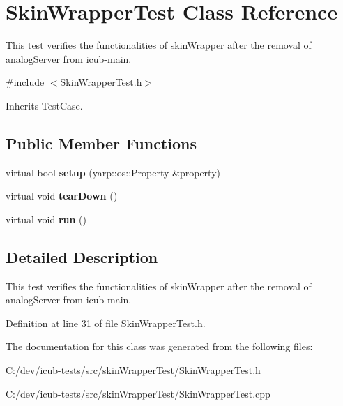 \section{Skin\+Wrapper\+Test Class Reference}
\label{classSkinWrapperTest}


This test verifies the functionalities of skin\+Wrapper after the removal of analog\+Server from icub-\/main.  




{\ttfamily \#include $<$Skin\+Wrapper\+Test.\+h$>$}



Inherits Test\+Case.

\subsection*{Public Member Functions}
\begin{DoxyCompactItemize}
\item 
\mbox{\label{classSkinWrapperTest_aa22a01cedaf43f2a9b19d8837379de99}} 
virtual bool {\bfseries setup} (yarp\+::os\+::\+Property \&property)
\item 
\mbox{\label{classSkinWrapperTest_ac79f439b54f8f4d3268cc9c63765b852}} 
virtual void {\bfseries tear\+Down} ()
\item 
\mbox{\label{classSkinWrapperTest_a5ffdc900a2af2b9371626f0b2588d65a}} 
virtual void {\bfseries run} ()
\end{DoxyCompactItemize}


\subsection{Detailed Description}
This test verifies the functionalities of skin\+Wrapper after the removal of analog\+Server from icub-\/main. 

Definition at line 31 of file Skin\+Wrapper\+Test.\+h.



The documentation for this class was generated from the following files\+:\begin{DoxyCompactItemize}
\item 
C\+:/dev/icub-\/tests/src/skin\+Wrapper\+Test/Skin\+Wrapper\+Test.\+h\item 
C\+:/dev/icub-\/tests/src/skin\+Wrapper\+Test/Skin\+Wrapper\+Test.\+cpp\end{DoxyCompactItemize}
